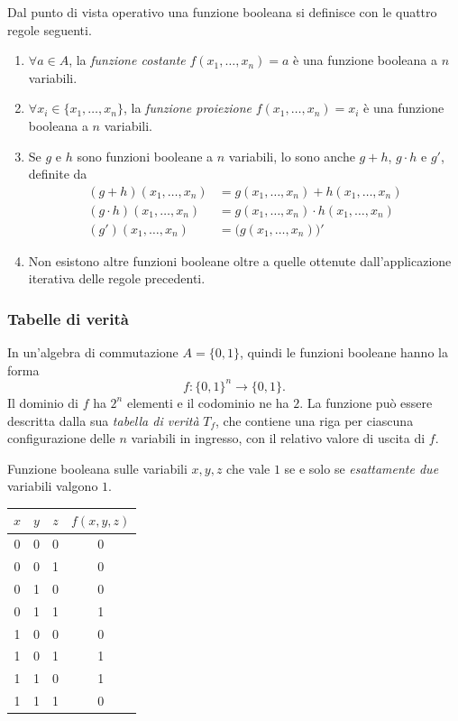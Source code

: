 \documentclass[11pt,a4paper]{article}
\begin{document}
Dal punto di vista operativo una funzione booleana si definisce con le quattro
regole seguenti.
\begin{enumerate}
    \item $\forall a \in A$, la \emph{funzione costante}
          $f(x_1, \dots, x_n) = a$ è una funzione booleana a $n$ variabili.
    \item $\forall x_i \in \{x_1, \dots, x_n\}$, la \emph{funzione proiezione}
          $f(x_1, \dots, x_n) = x_i$ è una funzione booleana a $n$ variabili.
    \item Se $g$ e $h$ sono funzioni booleane a $n$ variabili, lo sono anche
          $g + h$, $g \cdot h$ e $g'$, definite da
          \begin{align*}
            (g + h)(x_1, \dots, x_n) &= g(x_1, \dots, x_n) + h(x_1, \dots, x_n)\\
            (g \cdot h)(x_1, \dots, x_n) &= g(x_1, \dots, x_n) \cdot h(x_1, \dots, x_n)\\
            (g')(x_1, \dots, x_n) &= \bigl(g(x_1, \dots, x_n)\bigr)'
          \end{align*}
    \item Non esistono altre funzioni booleane oltre a quelle ottenute
          dall'applicazione iterativa delle regole precedenti.
\end{enumerate}

\subsubsection{Tabelle di verità}

In un'algebra di commutazione $A = \{0,1\}$, quindi le funzioni booleane hanno
la forma
\[
  f \colon \{0,1\}^n \to \{0,1\}.
\]
Il dominio di $f$ ha $2^n$ elementi e il codominio ne ha $2$. La funzione può
essere descritta dalla sua \emph{tabella di verità} $T_f$, che contiene una riga
per ciascuna configurazione delle $n$ variabili in ingresso, con il relativo
valore di uscita di $f$.

\begin{esempio}
Funzione booleana sulle variabili $x, y, z$ che vale $1$ se e solo se
\emph{esattamente due} variabili valgono $1$.
\begin{center}
\begin{tabular}{ccc|c}
$x$ & $y$ & $z$ & $f(x,y,z)$ \\ \midrule
0 & 0 & 0 & 0 \\
0 & 0 & 1 & 0 \\
0 & 1 & 0 & 0 \\
0 & 1 & 1 & 1 \\
1 & 0 & 0 & 0 \\
1 & 0 & 1 & 1 \\
1 & 1 & 0 & 1 \\
1 & 1 & 1 & 0
\end{tabular}
\end{center}
\end{esempio}
\end{document}
